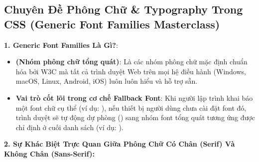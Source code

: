 \subsection{Chuyên Đề Phông Chữ \& Typography Trong CSS (Generic Font Families Masterclass)}
\label{sec:css_typography_foundations}

\begin{conceptBox}
\textbf{1. Generic Font Families Là Gì?}:
\begin{itemize}[leftmargin=1.5em, itemsep=3pt, parsep=0pt]
    \item \textbf{ (Nhóm phông chữ tổng quát)}: Là các nhóm phông chữ mặc định chuẩn hóa bởi W3C mà tất cả trình duyệt Web trên mọi hệ điều hành (Windows, macOS, Linux, Android, iOS) luôn luôn hiểu và hỗ trợ sẵn.
    \item \textbf{Vai trò cốt lõi trong cơ chế Fallback Font}: Khi người lập trình khai báo một font chữ cụ thể (ví dụ: ), nếu thiết bị người dùng chưa cài đặt font đó, trình duyệt sẽ tự động dự phòng () sang nhóm font tổng quát tương ứng được chỉ định ở cuối danh sách (ví dụ: ).
\end{itemize}
\end{conceptBox}

\textbf{2. Sự Khác Biệt Trực Quan Giữa Phông Chữ Có Chân (Serif) Và Không Chân (Sans-Serif):}

